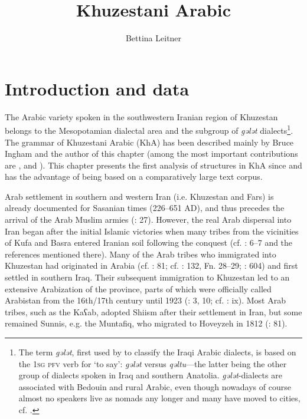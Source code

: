 \documentclass[output=paper,colorlinks,citecolor=brown,draftmode]{langscibook}
\author{Bettina Leitner\orcid{0000-0001-6712-302X}\affiliation{Universität Wien}}
\title{Khuzestani Arabic}
\begin{document}
\maketitle\label{WOWA:ch:14}



\section{Introduction and data}\label{Khuzestani:ss:1}

The Arabic variety spoken in the southwestern Iranian region of Khuzestan belongs to the Mesopotamian dialectal area and the subgroup of \textit{gələt} dialects\footnote{The term \textit{gələt}, first used by \citet{Blanc1964CDBaghdad} to classify the Iraqi Arabic dialects, is based on the \textsc{1sg pfv} verb for `to say': \textit{gələt} versus \textit{qəltu}—the latter being the other group of dialects spoken in Iraq and southern Anatolia. \textit{gələt}-dialects are associated with Bedouin and rural Arabic, even though nowadays of course almost no speakers live as nomads any longer and many have moved to cities, cf. \citet{leitnerNew2021}.}. The grammar of Khuzestani Arabic (KhA) has been described mainly by Bruce Ingham and the author of this chapter (among the most important contributions are \citealt{ingham1973,ingham1976,ingham2008}, and \citealt{leitnerGrammar2022}). This chapter presents the first analysis of  structures in KhA since \citet{ingham1991} and has the advantage of being based on a comparatively large text corpus. 

Arab settlement in southern and western Iran (i.e. Khuzestan and Fars) is already documented for Sasanian times (226–651 AD), and thus precedes the arrival of the Arab Muslim armies (\citealt{zarrinkub1975}: 27). However, the real Arab dispersal into Iran began after the initial Islamic victories when many tribes from the vicinities of Kufa and Basra entered Iranian soil following the conquest (cf. \citealt{leitnerGrammar2022}: 6–7 and the references mentioned there). Many of the Arab tribes who immigrated into Khuzestan had originated in Arabia (cf. \citealt{savory1986}: 81; cf. \citealt{nadjmabadi2009}: 132, Fn. 28–29; \citealt{field1939}: 604) and first settled in southern Iraq. Their subsequent immigration to Khuzestan led to an extensive Arabization of the province, parts of which were officially called Arabistan from the 16th/17th century until 1923 (\citealt{oppenheim1967}: 3, 10; cf. \citealt{ingham1997}: ix). Most Arab tribes, such as the Kaʕab, adopted Shiism after their settlement in Iran, but some remained Sunnis, e.g. the Muntafiq, who migrated to Hoveyzeh in 1812 (\citealt{savory1986}: 81). 
\end{document}
